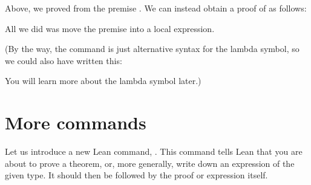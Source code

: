 \documentclass[letterpaper,10pt,english]{sphinxmanual}
\begin{document}
\begin{sphinxVerbatim}[commandchars=\\\{\}]
        
\end{sphinxVerbatim}

\sphinxAtStartPar
Above, we proved  from the premise . We can instead obtain a proof of  as follows:

\begin{sphinxVerbatim}[commandchars=\\\{\}]
             
\end{sphinxVerbatim}

\sphinxAtStartPar
All we did was move the premise into a local  expression.

\sphinxAtStartPar
(By the way, the  command is just alternative syntax for the lambda symbol, so we could also have written this:

\begin{sphinxVerbatim}[commandchars=\\\{\}]
             
\end{sphinxVerbatim}

\sphinxAtStartPar
You will learn more about the lambda symbol later.)


\section{More commands}
\label{\detokenize{propositional_logic_in_lean:more-commands}}
\sphinxAtStartPar
Let us introduce a new Lean command, . This command tells Lean that you are about to prove a theorem, or, more generally, write down an expression of the given type. It should then be followed by the proof or expression itself.
\end{document}
